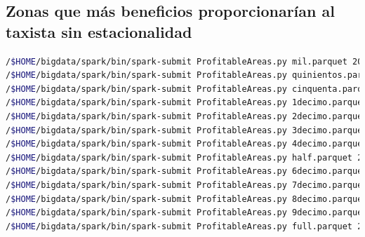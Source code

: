 \subsection{Zonas que más beneficios proporcionarían al taxista sin estacionalidad}
\begin{lstlisting}[label=sprof,language=sh,frame=single,caption=Script onas que más beneficios proporcionarían al taxista sin estacionalidad en modo pseudo-distribuido]
/$HOME/bigdata/spark/bin/spark-submit ProfitableAreas.py mil.parquet 2013-01-01 09:45
/$HOME/bigdata/spark/bin/spark-submit ProfitableAreas.py quinientos.parquet 2013-01-01 09:45
/$HOME/bigdata/spark/bin/spark-submit ProfitableAreas.py cinquenta.parquet 2013-01-01 09:45
/$HOME/bigdata/spark/bin/spark-submit ProfitableAreas.py 1decimo.parquet 2013-01-01 09:45
/$HOME/bigdata/spark/bin/spark-submit ProfitableAreas.py 2decimo.parquet 2013-01-01 09:45
/$HOME/bigdata/spark/bin/spark-submit ProfitableAreas.py 3decimo.parquet 2013-01-01 09:45
/$HOME/bigdata/spark/bin/spark-submit ProfitableAreas.py 4decimo.parquet 2013-01-01 09:45
/$HOME/bigdata/spark/bin/spark-submit ProfitableAreas.py half.parquet 2013-01-01 09:45
/$HOME/bigdata/spark/bin/spark-submit ProfitableAreas.py 6decimo.parquet 2013-01-01 09:45
/$HOME/bigdata/spark/bin/spark-submit ProfitableAreas.py 7decimo.parquet 2013-01-01 09:45
/$HOME/bigdata/spark/bin/spark-submit ProfitableAreas.py 8decimo.parquet 2013-01-01 09:45
/$HOME/bigdata/spark/bin/spark-submit ProfitableAreas.py 9decimo.parquet 2013-01-01 09:45
/$HOME/bigdata/spark/bin/spark-submit ProfitableAreas.py full.parquet 2013-01-01 09:45
\end{lstlisting}
\clearpage
